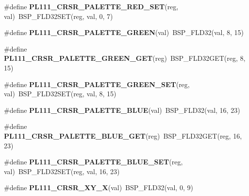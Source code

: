 \begin{DoxyCompactItemize}
\item 
\mbox{\label{arm-pl111-regs_8h_a4f51ddbb3a1a8541aa764e58b24fa08b}} 
\#define {\bfseries P\+L111\+\_\+\+C\+R\+S\+R\+\_\+\+P\+A\+L\+E\+T\+T\+E\+\_\+\+R\+E\+D\+\_\+\+S\+ET}(reg,  val)~B\+S\+P\+\_\+\+F\+L\+D32\+S\+ET(reg, val, 0, 7)
\item 
\mbox{\label{arm-pl111-regs_8h_ae2e5c7fbcae8c80939d916f366155fb6}} 
\#define {\bfseries P\+L111\+\_\+\+C\+R\+S\+R\+\_\+\+P\+A\+L\+E\+T\+T\+E\+\_\+\+G\+R\+E\+EN}(val)~B\+S\+P\+\_\+\+F\+L\+D32(val, 8, 15)
\item 
\mbox{\label{arm-pl111-regs_8h_a4a72ab7da041a3d59f9b9441f9e510d0}} 
\#define {\bfseries P\+L111\+\_\+\+C\+R\+S\+R\+\_\+\+P\+A\+L\+E\+T\+T\+E\+\_\+\+G\+R\+E\+E\+N\+\_\+\+G\+ET}(reg)~B\+S\+P\+\_\+\+F\+L\+D32\+G\+ET(reg, 8, 15)
\item 
\mbox{\label{arm-pl111-regs_8h_a7c86fe64e459eb01a1386a3e5c8e507c}} 
\#define {\bfseries P\+L111\+\_\+\+C\+R\+S\+R\+\_\+\+P\+A\+L\+E\+T\+T\+E\+\_\+\+G\+R\+E\+E\+N\+\_\+\+S\+ET}(reg,  val)~B\+S\+P\+\_\+\+F\+L\+D32\+S\+ET(reg, val, 8, 15)
\item 
\mbox{\label{arm-pl111-regs_8h_a90b33d4d6b20402647c32e55de39c542}} 
\#define {\bfseries P\+L111\+\_\+\+C\+R\+S\+R\+\_\+\+P\+A\+L\+E\+T\+T\+E\+\_\+\+B\+L\+UE}(val)~B\+S\+P\+\_\+\+F\+L\+D32(val, 16, 23)
\item 
\mbox{\label{arm-pl111-regs_8h_a01245e8470de036f1b7aef831ad11923}} 
\#define {\bfseries P\+L111\+\_\+\+C\+R\+S\+R\+\_\+\+P\+A\+L\+E\+T\+T\+E\+\_\+\+B\+L\+U\+E\+\_\+\+G\+ET}(reg)~B\+S\+P\+\_\+\+F\+L\+D32\+G\+ET(reg, 16, 23)
\item 
\mbox{\label{arm-pl111-regs_8h_a465170acee44663c20a2e1ddbdf37d10}} 
\#define {\bfseries P\+L111\+\_\+\+C\+R\+S\+R\+\_\+\+P\+A\+L\+E\+T\+T\+E\+\_\+\+B\+L\+U\+E\+\_\+\+S\+ET}(reg,  val)~B\+S\+P\+\_\+\+F\+L\+D32\+S\+ET(reg, val, 16, 23)
\item 
\mbox{\label{arm-pl111-regs_8h_ab16b34cbeee0c7b6013600f102ef12bb}} 
\#define {\bfseries P\+L111\+\_\+\+C\+R\+S\+R\+\_\+\+X\+Y\+\_\+X}(val)~B\+S\+P\+\_\+\+F\+L\+D32(val, 0, 9)

\end{DoxyCompactItemize}
